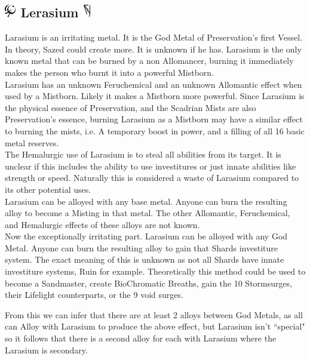 \documentclass[conference]{IEEEtran}
\begin{document}
\subsection*{\includegraphics[height=1em]{images/Lerasium.png}  Lerasium \includegraphics[height=1em]{images/Lerasium_(Feruchemy).png}}
Larasium is an irritating metal.  It is the God Metal of Preservation's first Vessel.  In theory, Sazed could create more.  It is unknown if he has.  Larasium is the only known metal that can be burned by a non Allomancer, burning it immediately makes the person who burnt it into a powerful Mistborn.\\

Larasium has an unknown Feruchemical and an unknown Allomantic effect when used by a Mistborn.  Likely it makes a Mistborn more powerful.  Since Larasium is the physical essence of Preservation, and the Scadrian Mists are also Preservation's essence, burning Larasium as a Mistborn may have a similar effect to burning the mists, i.e. A temporary boost in power, and a filling of all 16 basic metal reserves.\\

The Hemalurgic use of Larasium is to steal all abilities from its target.  It is unclear if this includes the ability to use investitures or just innate abilities like strength or speed.  Naturally this is considered a waste of Larasium compared to its other potential uses.\\

Larasium can be alloyed with any base metal.  Anyone can burn the resulting alloy to become a Misting in that metal.  The other Allomantic, Feruchemical, and Hemalurgic effects of these alloys are not known.\\

Now the exceptionally irritating part.  Larasium can be alloyed with any God Metal.  Anyone can burn the resulting alloy to gain that Shards investiture system.  The exact meaning of this is unknown as not all Shards have innate investiture systems, Ruin for example.  Theoretically this method could be used to become a Sandmaster, create BioChromatic Breaths, gain the 10 Stormsurges, their Lifelight counterparts, or the 9 void surges.

From this we can infer that there are at least 2 alloys between God Metals, as all can Alloy with Larasium to produce the above effect, but Larasium isn't ``special" so it follows that there is a second alloy for each with Larasium where the Larasium is secondary.  
\end{document}
